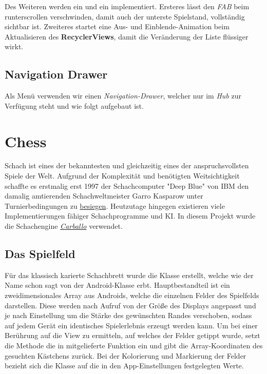 Des Weiteren werden ein  und ein
 implementiert. Ersteres lässt den \emph{FAB}
beim runterscrollen verschwinden, damit auch der unterste Spielstand,
vollständig sichtbar ist. Zweiteres startet eine Aus- und Einblende-Animation
beim Aktualisieren des \textbf{RecyclerViews}, damit die Veränderung der Liste
flüssiger wirkt.

\subsection{Navigation Drawer}

Als Menü verwenden wir einen \emph{Navigation-Drawer}, welcher nur im \emph{Hub}
zur Verfügung steht und wie folgt aufgebaut ist.


\section{Chess}
\sectionauthor{\oliver}

Schach ist eines der bekanntesten und gleichzeitig eines der anspruchsvollsten
Spiele der Welt. Aufgrund der Komplexität und benötigten Weitsichtigkeit
schaffte es erstmalig erst 1997 der Schachcomputer "Deep Blue" von IBM den
damalig amtierenden Schachweltmeister Garro Kasparow unter Turnierbedingungen  zu \href{http://www.chessgames.com/perl/chesscollection?cid=1014770}{besiegen}.
Heutzutage hingegen existieren viele Implementierungen
fähiger Schachprogramme und KI. In diesem Projekt wurde die Schachengine
\hyperlink{https://github.com/albertoruibal/carballo}{\emph{Carballo}}
verwendet.

\subsection{Das Spielfeld}

Für das klassisch karierte Schachbrett wurde die Klasse
 erstellt, welche wie der Name schon sagt von der
Android-Klasse  erbt. Hauptbestandteil ist ein zweidimensionales
Array aus Androids, welche die einzelnen Felder des Spielfelds
darstellen. Diese werden nach Aufruf von  der Größe des
Displays angepasst und je nach Einstellung um die Stärke des gewünschten Randes
verschoben, sodass auf jedem Gerät ein identisches Spielerlebnis erzeugt werden
kann. Um bei einer Berührung auf die View zu ermitteln, auf welches der Felder
getippt wurde, setzt die Methode  die in
 mitgelieferte Funktion  ein und gibt
die Array-Koordinaten des gesuchten Kästchens zurück. Bei der Kolorierung und
Markierung der Felder bezieht sich die Klasse auf die in den App-Einstellungen
festgelegten Werte.

